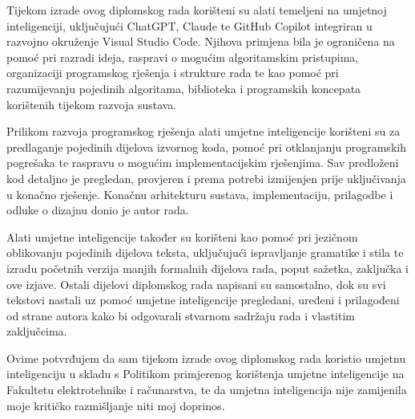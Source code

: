 \documentclass[diplomskirad]{fer}
\begin{document}

\begin{izjavaoui}
	
	Tijekom izrade ovog diplomskog rada korišteni su alati temeljeni na umjetnoj inteligenciji, uključujući ChatGPT, Claude te GitHub Copilot integriran u razvojno okruženje Visual Studio Code. Njihova primjena bila je ograničena na pomoć pri razradi ideja, raspravi o mogućim algoritamskim pristupima, organizaciji programskog rješenja i strukture rada te kao pomoć pri razumijevanju pojedinih algoritama, biblioteka i programskih koncepata korištenih tijekom razvoja sustava.
	
	Prilikom razvoja programskog rješenja alati umjetne inteligencije korišteni su za predlaganje pojedinih dijelova izvornog koda, pomoć pri otklanjanju programskih pogrešaka te raspravu o mogućim implementacijskim rješenjima. Sav predloženi kod detaljno je pregledan, provjeren i prema potrebi izmijenjen prije uključivanja u konačno rješenje. Konačnu arhitekturu sustava, implementaciju, prilagodbe i odluke o dizajnu donio je autor rada.
	
	Alati umjetne inteligencije također su korišteni kao pomoć pri jezičnom oblikovanju pojedinih dijelova teksta, uključujući ispravljanje gramatike i stila te izradu početnih verzija manjih formalnih dijelova rada, poput sažetka, zaključka i ove izjave. Ostali dijelovi diplomskog rada napisani su samostalno, dok su svi tekstovi nastali uz pomoć umjetne inteligencije pregledani, uređeni i prilagođeni od strane autora kako bi odgovarali stvarnom sadržaju rada i vlastitim zaključcima.
	
	Ovime potvrđujem da sam tijekom izrade ovog diplomskog rada koristio umjetnu inteligenciju u skladu s Politikom primjerenog korištenja umjetne inteligencije na Fakultetu elektrotehnike i računarstva, te da umjetna inteligencija nije zamijenila moje kritičko razmišljanje niti moj doprinos.


	
	

\end{izjavaoui}
\end{document}
